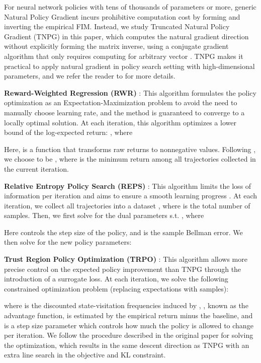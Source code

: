 \documentclass{article}
\begin{document}
For neural network policies with tens of thousands of parameters or more, generic Natural Policy Gradient incurs prohibitive computation cost by forming and inverting the empirical FIM. Instead, we study Truncated Natural Policy Gradient (TNPG) in this paper, which computes the natural gradient direction without explicitly forming the matrix inverse, using a conjugate gradient algorithm that only requires computing  for arbitrary vector . TNPG makes it practical to apply natural gradient in policy search setting with high-dimensional parameters, and we refer the reader to \citet{Schulman15TRPO} for more details.

{\bf Reward-Weighted Regression (RWR)} \cite{Peters07RWR, Kober09POWER}: This algorithm formulates the policy optimization as an Expectation-Maximization problem to avoid the need to manually choose learning rate, and the method is guaranteed to converge to a locally optimal solution. At each iteration, this algorithm optimizes a lower bound of the log-expected return: , where

Here,  is a function that transforms raw returns to nonnegative values. Following \citet{Deisenroth2013PSSurvey}, we choose  to be , where  is the minimum return among all trajectories collected in the current iteration.



{\bf Relative Entropy Policy Search (REPS)} \cite{Peters10REPS}: This algorithm limits the loss of information per iteration and aims to ensure a smooth learning progress \cite{Deisenroth2013PSSurvey}. At each iteration, we collect all trajectories into a dataset , where  is the total number of samples. Then, we first solve for the dual parameters  s.t. , where

Here  controls the step size of the policy, and  is the sample Bellman error. We then solve for the new policy parameters: 




{\bf Trust Region Policy Optimization (TRPO)} \cite{Schulman15TRPO}: 
This algorithm allows more precise control on the expected policy improvement than TNPG through the introduction of a surrogate loss.
At each iteration, we solve the following constrained optimization problem (replacing expectations with samples):

where  is the discounted state-visitation frequencies induced by ,
, known as the advantage function, is estimated by the empirical return minus the baseline, and  is a step size parameter which controls how much the policy is allowed to change per iteration. We follow the procedure described in the original paper for solving the optimization, which results in the same descent direction as TNPG with an extra line search in the objective and KL constraint.
\end{document}
